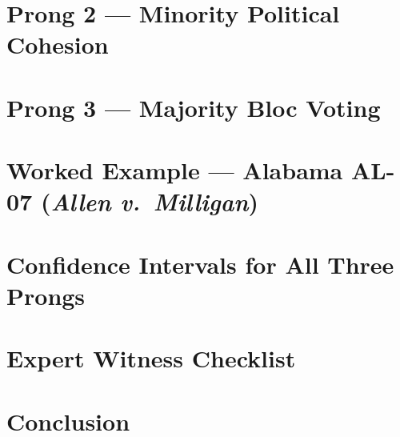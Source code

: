 \documentclass[12pt]{article}
\begin{document}
\section{Prong 2 --- Minority Political Cohesion}


\section{Prong 3 --- Majority Bloc Voting}


\section{Worked Example --- Alabama AL-07 (\textit{Allen v.\ Milligan})}


\section{Confidence Intervals for All Three Prongs}


\section{Expert Witness Checklist}


\section{Conclusion}




\end{document}
